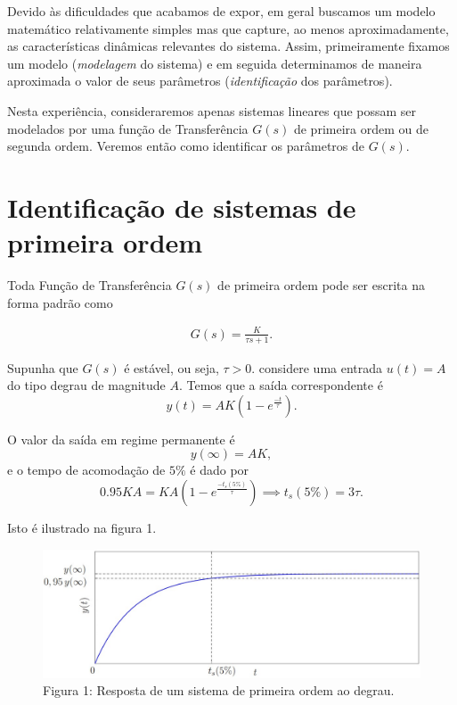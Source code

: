 \documentclass[
]{book}
\theoremstyle{definition}
\theoremstyle{definition}
\theoremstyle{definition}
\theoremstyle{remark}
\begin{document}
Devido às dificuldades que acabamos de expor, em geral buscamos um modelo matemático relativamente simples mas que capture, ao menos aproximadamente, as características dinâmicas relevantes do sistema. Assim, primeiramente fixamos um modelo (\emph{modelagem} do sistema) e em seguida determinamos de maneira aproximada o valor de seus parâmetros (\emph{identificação} dos parâmetros).

Nesta experiência, consideraremos apenas sistemas lineares que possam ser modelados por uma função de Transferência \(G(s)\) de primeira ordem ou de segunda ordem. Veremos então como identificar os parâmetros de \(G(s)\).

\hypertarget{identificauxe7uxe3o-de-sistemas-de-primeira-ordem}{%
\section{Identificação de sistemas de primeira ordem}\label{identificauxe7uxe3o-de-sistemas-de-primeira-ordem}}

Toda Função de Transferência \(G(s)\) de primeira ordem pode ser escrita na forma padrão como

\begin{align}
G(s) = \frac{K}{\tau s+1}. \label{eq:eq31}
\end{align}

Supunha que \(G(s)\) é estável, ou seja, \(\tau > 0\). considere uma entrada \(u(t) = A\) do tipo degrau de magnitude \(A\). Temos que a saída correspondente é
\[
y(t) = AK(1- e^{\frac {-t}{\tau}}).
\]

O valor da saída em regime permanente é
\[
y(\infty) = AK,
\]
e o tempo de acomodação de \(5\%\) é dado por
\[
0.95KA = KA(1- e^{\frac {-t_s(5\%)}{\tau}}) \implies t_s(5\%) =3 \tau.
\]

Isto é ilustrado na figura 1.

\begin{figure}
\centering
\includegraphics{Imagens/Lab3/Explicação/fig1.jpg}
\caption{Figura 1: Resposta de um sistema de primeira ordem ao degrau.}
\end{figure}
\end{document}
